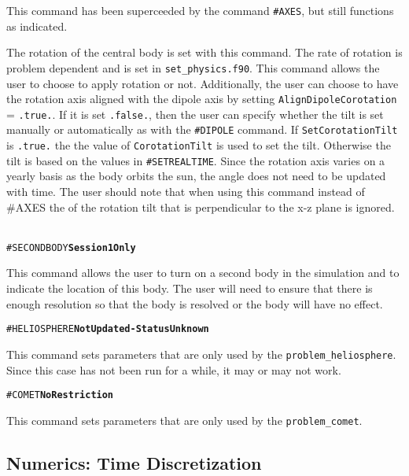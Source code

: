 This command has been superceeded by the command {\tt \#AXES}, but still functions
as indicated.

The rotation of the central body is set with this command.  The rate of rotation
is problem dependent and is set in {\tt set\_physics.f90}.  This command allows
the user to choose to apply rotation or not.  Additionally, the user can choose
to have the rotation axis aligned with the dipole axis by setting 
{\tt AlignDipoleCorotation} = {\tt .true.}.  If it is set {\tt .false.}, then the
user can specify whether the tilt is set manually or automatically 
as with the {\tt \#DIPOLE} command.  If {\tt SetCorotationTilt} is {\tt .true.}
the the value of  {\tt CorotationTilt} is used to set the tilt.  Otherwise the
tilt is based on the values in {\tt \#SETREALTIME}.  Since the rotation axis
varies on a yearly basis as the body orbits the sun, the angle does not need
to be updated with time.  The user should note that when using this command
instead of {\#AXES} the of the rotation tilt that is perpendicular to the 
x-z plane is ignored.
\ \ \\

\begin{alltt}
#SECONDBODY  \hfill {\bf Session 1 Only}
\end{alltt}

This command allows the user to turn on a second body in the simulation and to
indicate the location of this body.  The user will need to ensure that there
is enough resolution so that the body is resolved or the body will have no
effect.
\ \ \\

\begin{alltt}
#HELIOSPHERE  \hfill  {\bf Not Updated - Status Unknown}
\end{alltt}

This command sets parameters that are only used by the {\tt problem\_heliosphere}.
Since this case has not been run for a while, it may or may not work.
\ \ \\

\begin{alltt}
#COMET      \hfill {\bf No Restriction}
\end{alltt}

This command sets parameters that are only used by the {\tt problem\_comet}.
\ \ \\



\subsection{Numerics: Time Discretization \label{section:time}}


